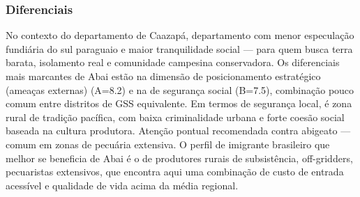 \subsubsection*{Diferenciais}\label{dif-abai-0602}
No contexto do departamento de Caazapá, departamento com menor especulação fundiária do sul paraguaio e maior tranquilidade social — para quem busca terra barata, isolamento real e comunidade campesina conservadora. Os diferenciais mais marcantes de Abai estão na dimensão de posicionamento estratégico (ameaças externas) (A=8.2) e na de segurança social (B=7.5), combinação pouco comum entre distritos de GSS equivalente. Em termos de segurança local, é zona rural de tradição pacífica, com baixa criminalidade urbana e forte coesão social baseada na cultura produtora. Atenção pontual recomendada contra abigeato — comum em zonas de pecuária extensiva. O perfil de imigrante brasileiro que melhor se beneficia de Abai é o de produtores rurais de subsistência, off-gridders, pecuaristas extensivos, que encontra aqui uma combinação de custo de entrada acessível e qualidade de vida acima da média regional.
